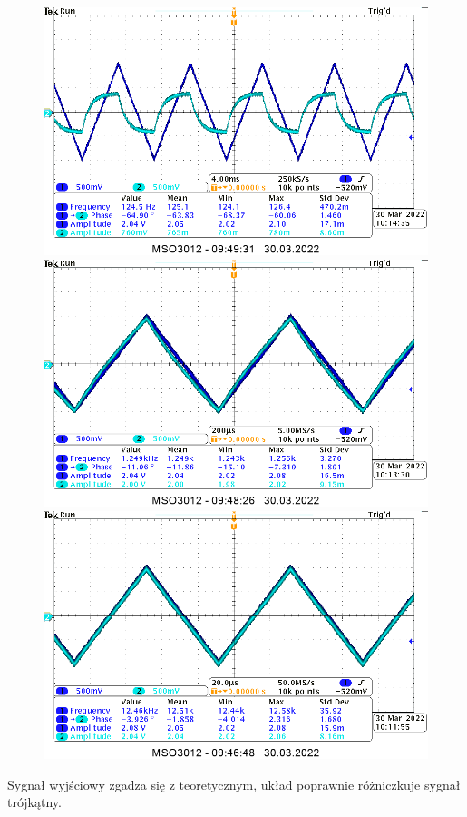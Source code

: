 \begin{figure}[H]
    \centering
    \includegraphics[scale=0.25]{img_osciloscope/CR_pros_troj/CR_trojkatna_mniejsze_tau_cropped.png}
    \includegraphics[scale=0.25]{img_osciloscope/CR_pros_troj/CR_trojkatna_rowne_tau_cropped.png}
    \includegraphics[scale=0.25]{img_osciloscope/CR_pros_troj/CR_trojkatna_wieksze_tau_cropped.png}
    \label{fig:CR_trojkatna}
\end{figure}

Sygnał wyjściowy zgadza się z teoretycznym, układ poprawnie różniczkuje sygnał trójkątny.